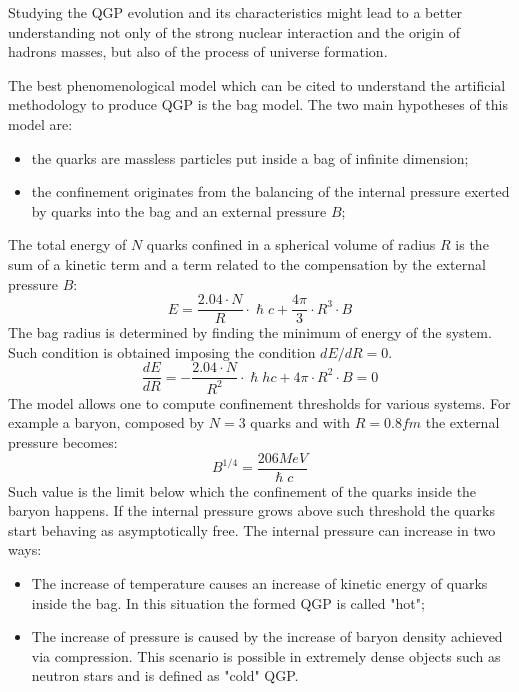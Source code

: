 Studying the QGP evolution and its characteristics might lead to a better understanding not only of the strong nuclear interaction and the origin of hadrons masses, but also of the process of universe formation.

The best phenomenological model which can be cited to understand the artificial methodology to produce QGP is the bag model.
The two main hypotheses of this model are:
\begin{itemize}
    \item the quarks are massless particles put inside a bag of infinite dimension;
    \item the confinement originates from the balancing of the internal pressure exerted by quarks into the bag and an external pressure $B$;
\end{itemize}
The total energy of $N$ quarks confined in a spherical volume of radius $R$ is the sum of a kinetic term and a term related to the compensation by the external pressure $B$:
\begin{equation}
    E=\frac{2.04\cdot N}{R}\cdot \hslash c + \frac{4\pi}{3}\cdot R^3\cdot B
\end{equation}
The bag radius is determined by finding the minimum of energy of the system.
Such condition is obtained imposing the condition $dE/dR=0$.
\begin{equation}
\frac{dE}{dR}=-\frac{2.04\cdot N}{R^2}\cdot \hslash{h}c + 4\pi\cdot R^2\cdot B = 0
\end{equation}
The model allows one to compute confinement thresholds for various systems.
For example a baryon, composed by $N=3$ quarks and with $R=0.8 fm$ the external pressure becomes:
\begin{equation}
B^{1/4} = \frac{206 MeV}{\hslash c}
\end{equation}
Such value is the limit below which the confinement of the quarks inside the baryon happens.
If the internal pressure grows above such threshold the quarks start behaving as asymptotically free.
The internal pressure can increase in two ways:
\begin{itemize}
\item The increase of temperature causes an increase of kinetic energy of quarks inside the bag. In this situation the formed QGP is called "hot";
\item The increase of pressure is caused by the increase of baryon density achieved via compression. This scenario is possible in extremely dense objects such as neutron stars and is defined as "cold" QGP.
\end{itemize}

